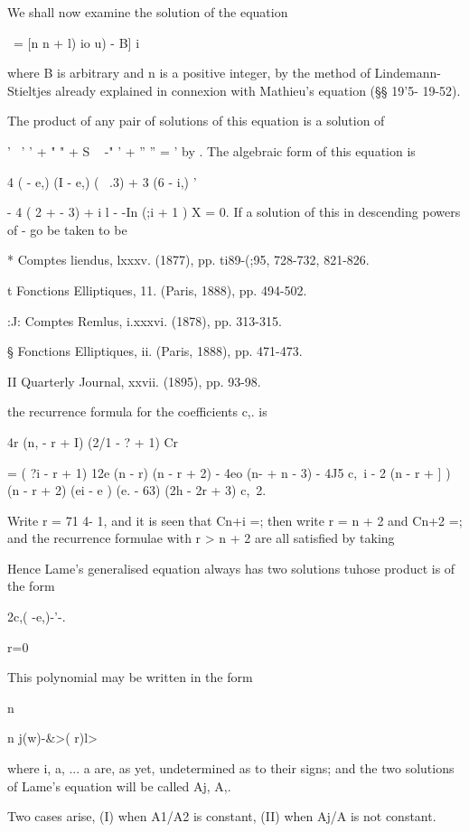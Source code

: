 {{{{{{{{We shall now examine the solution of the equation

 \ = [n n + l) io u) - B] i\,

where B is arbitrary and n is a positive integer, by the method of
Lindemann- Stieltjes already explained in connexion with Mathieu's
equation (§§ 19'5- 19-52).

The product of any pair of solutions of this equation is a solution of

'~ ' ' + " " + S ~ -" ' + '' '' = ' by . The algebraic form of
this equation is

4 ( - e,) (I - e,) ( \ .3) + 3 (6 - i,) '

- 4 ( 2 + - 3) + i l - -In (;i + 1 ) X = 0. If a solution of this in
descending powers of - go be taken to be

* Comptes liendus, lxxxv. (1877), pp. ti89-(;95, 728-732, 821-826.

t Fonctions Elliptiques, 11. (Paris, 1888), pp. 494-502.

:J: Comptes Remlus, i.xxxvi. (1878), pp. 313-315.

§ Fonctions Elliptiques, ii. (Paris, 1888), pp. 471-473.

II Quarterly Journal, xxvii. (1895), pp. 93-98.

%
%

the recurrence formula for the coefficients c,. is

4r (n, - r + I) (2/1 - ? + 1) Cr

= ( ?i - r + 1) 12e (n - r) (n - r + 2) - 4eo (n- + n - 3) - 4J5 c,\ i
- 2 (n - r + ] ) (n - r + 2) (ei - e ) (e. - 63) (2h - 2r + 3) c,\ 2.

Write r = 71 4- 1, and it is seen that Cn+i =; then write r = n + 2
and Cn+2 =; and the recurrence formulae with r > n + 2 are all
satisfied by taking

Hence Lame's generalised equation always has two solutions tuhose
product is of the form

2c,( -e,)-'-.

r=0

This polynomial may be written in the form

n

n j(w)-\&>( r)l>

where i, a, ... a are, as yet, undetermined as to their signs; and
the two solutions of Lame's equation will be called Aj, A,.

Two cases arise, (I) when A1/A2 is constant, (II) when Aj/A is not
constant.

}}}}}}}}
